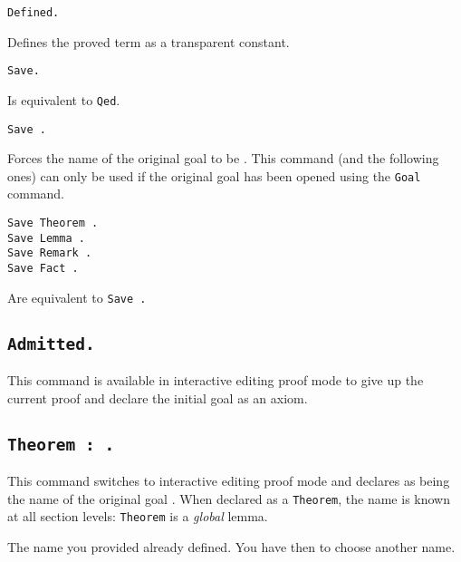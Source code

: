 \begin{Variants}

\item {\tt Defined.}
\label{Defined} 

  Defines the proved term as a transparent constant.

\item {\tt Save.}

  Is equivalent to {\tt Qed}.

\item {\tt Save {\ident}.}
  
  Forces the name of the original goal to be {\ident}.  This command
  (and the following ones) can only be used if the original goal has
  been opened using the {\tt Goal} command.

\item {\tt Save Theorem {\ident}.} \\
 {\tt Save Lemma {\ident}.} \\
 {\tt Save Remark {\ident}.}\\
 {\tt Save Fact {\ident}.}

  Are equivalent to {\tt Save {\ident}.} 
\end{Variants}

\subsection[\tt Admitted.]{\tt Admitted.\label{Admitted}}
This command is available in interactive editing proof mode to give up
the current proof and declare the initial goal as an axiom.

\subsection[\tt Theorem {\ident} : {\form}.]{\tt Theorem {\ident} : {\form}.
\label{Theorem}}

This command switches to interactive editing proof mode and declares
{\ident} as being the name of the original goal {\form}. When declared
as a {\tt Theorem}, the name {\ident} is known at all section levels:
{\tt Theorem} is a {\sl global} lemma.


\begin{ErrMsgs}

\item {}

\item {}
 
  The name you provided already defined. You have then to choose
  another name.

\end{ErrMsgs}


